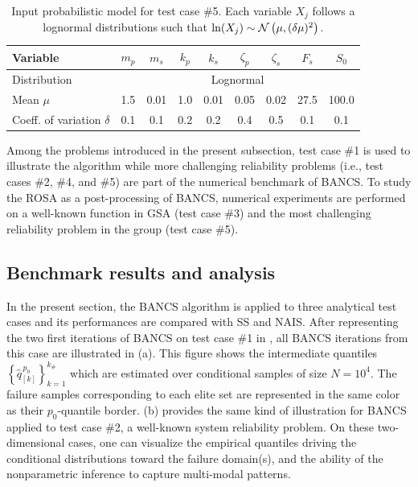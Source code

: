 \begin{table}[h]
\centering
\begin{tabular}{ lcccccccc }
    \hline
    Variable                     & $m_p$ & $m_s$ & $k_p$ & $k_s$ & $\zeta_p$ & $\zeta_s$ & $F_s$ & $S_0$ \\
    \hline          
    Distribution                 &  \multicolumn{8}{c}{Lognormal} \\ 
    Mean $\mu$                   & 1.5 & 0.01 & 1.0 & 0.01 & 0.05 & 0.02 & 27.5 & 100.0\\ 
    Coeff. of variation $\delta$ & 0.1 & 0.1 & 0.2 & 0.2 & 0.4 & 0.5 & 0.1 & 0.1\\
    \hline
\end{tabular}
\caption{Input probabilistic model for test case \#5. Each variable $X_j$ follows a lognormal distributions such that $\mathrm{ln}(X_j)\sim \mathcal{N}\left(\mu, (\delta \mu)^2 \right)$.}
\label{tab:oscillator}
\end{table}

Among the problems introduced in the present subsection, test case \#1 is used to illustrate the algorithm while more challenging reliability problems (i.e., test cases \#2, \#4, and \#5) are part of the numerical benchmark of BANCS. 
To study the ROSA as a post-processing of BANCS, numerical experiments are performed on a well-known function in GSA (test case \#3) and the most challenging reliability problem in the group (test case \#5). 

\subsection{Benchmark results and analysis}

In the present section, the BANCS algorithm is applied to three analytical test cases and its performances are compared with SS and NAIS. 
After representing the two first iterations of BANCS on test case \#1 in , all BANCS iterations from this case are illustrated in  (a). 
This figure shows the intermediate quantiles $\left\{\widehat{q}_{[k]}^{\, p_0}\right\}_{k=1}^{k_\#}$ which are estimated over conditional samples of size $N=10^4$. 
The failure samples corresponding to each elite set are represented in the same color as their $p_0$-quantile border. 
 (b) provides the same kind of illustration for BANCS applied to test case \#2, a well-known system reliability problem. 
On these two-dimensional cases, one can visualize the empirical quantiles driving the conditional distributions toward the failure domain(s), and the ability of the nonparametric inference to capture multi-modal patterns.  

